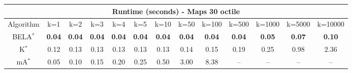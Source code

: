 \begin{tabular}{c|cccccccccccc}\toprule
\multicolumn{13}{c}{Runtime (seconds) - Maps 30 octile}\\ \midrule
Algorithm & k=1 & k=2 & k=3 & k=4 & k=5 & k=10 & k=50 & k=100 & k=500 & k=1000 & k=5000 & k=10000 \\ \midrule
BELA$^*$ & \textbf{0.04} & \textbf{0.04} & \textbf{0.04} & \textbf{0.04} & \textbf{0.04} & \textbf{0.04} & \textbf{0.04} & \textbf{0.04} & \textbf{0.04} & \textbf{0.05} & \textbf{0.07} & \textbf{0.10} \\
K$^*$ & 0.12 & 0.13 & 0.13 & 0.13 & 0.13 & 0.13 & 0.14 & 0.15 & 0.19 & 0.25 & 0.98 & 2.36 \\
mA$^*$ & 0.05 & 0.10 & 0.15 & 0.20 & 0.25 & 0.50 & 3.00 & 8.38 & -- & -- & -- & -- \\ \bottomrule 
\end{tabular}
